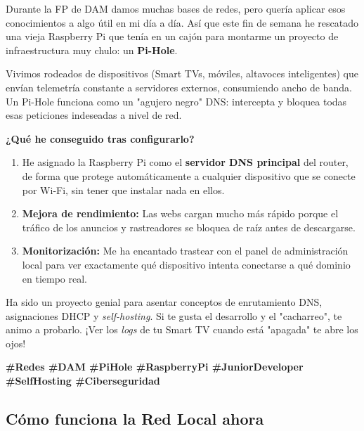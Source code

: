 \documentclass[11pt, a4paper]{article}
\begin{document}
Durante la FP de DAM damos muchas bases de redes, pero quería aplicar esos conocimientos a algo útil en mi día a día. Así que este fin de semana he rescatado una vieja Raspberry Pi que tenía en un cajón para montarme un proyecto de infraestructura muy chulo: un \textbf{Pi-Hole}.

Vivimos rodeados de dispositivos (Smart TVs, móviles, altavoces inteligentes) que envían telemetría constante a servidores externos, consumiendo ancho de banda. Un Pi-Hole funciona como un "agujero negro" DNS: intercepta y bloquea todas esas peticiones indeseadas a nivel de red.

\textbf{¿Qué he conseguido tras configurarlo?}
\begin{enumerate}
    \item He asignado la Raspberry Pi como el \textbf{servidor DNS principal} del router, de forma que protege automáticamente a cualquier dispositivo que se conecte por Wi-Fi, sin tener que instalar nada en ellos.
    \item \textbf{Mejora de rendimiento:} Las webs cargan mucho más rápido porque el tráfico de los anuncios y rastreadores se bloquea de raíz antes de descargarse.
    \item \textbf{Monitorización:} Me ha encantado trastear con el panel de administración local para ver exactamente qué dispositivo intenta conectarse a qué dominio en tiempo real. 
\end{enumerate}

Ha sido un proyecto genial para asentar conceptos de enrutamiento DNS, asignaciones DHCP y \textit{self-hosting}. Si te gusta el desarrollo y el "cacharreo", te animo a probarlo. ¡Ver los \textit{logs} de tu Smart TV cuando está "apagada" te abre los ojos!

\vspace{0.5cm}
\textbf{\#Redes \#DAM \#PiHole \#RaspberryPi \#JuniorDeveloper \#SelfHosting \#Ciberseguridad}

\vspace{1cm}

\subsection*{Cómo funciona la Red Local ahora}

\vspace{0.5cm}
\end{document}
